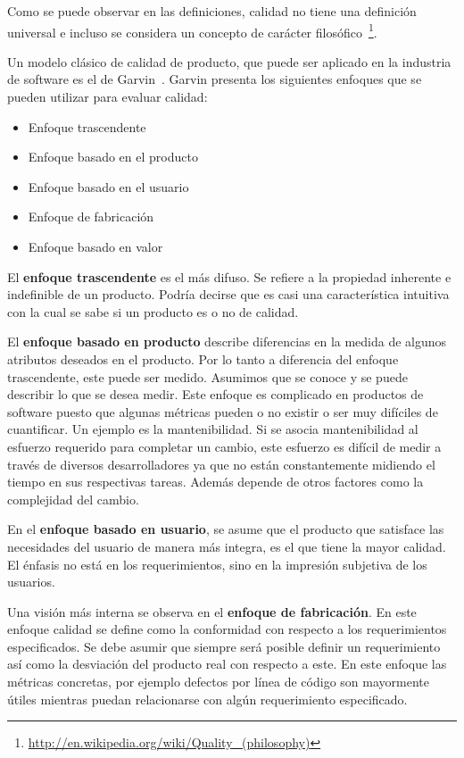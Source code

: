 Como se puede observar en las definiciones, calidad no tiene una definición universal e incluso se considera
un concepto de carácter filosófico~\footnote{\url{http://en.wikipedia.org/wiki/Quality_(philosophy)}}.

Un modelo clásico de calidad de producto, que puede ser aplicado en la industria
de software es el de Garvin~\cite{Garvin:1984}. Garvin presenta los siguientes
enfoques que se pueden utilizar para evaluar calidad:
\begin{itemize}
    \item Enfoque trascendente
    \item Enfoque basado en el producto
    \item Enfoque basado en el usuario
    \item Enfoque de fabricación
    \item Enfoque basado en valor
\end{itemize}

El \textbf{enfoque trascendente} es el más difuso. Se refiere a la propiedad inherente
e indefinible de un producto. Podría decirse que es casi una característica 
intuitiva con la cual se sabe si un producto es o no de calidad.

El \textbf{enfoque basado en producto} describe diferencias en la medida de algunos
atributos deseados en el producto. Por lo tanto a diferencia del enfoque
trascendente, este puede ser medido. Asumimos que se conoce y se puede 
describir lo que se desea medir.
Este enfoque es complicado en productos de software puesto que algunas métricas
pueden o no existir o ser muy difíciles de cuantificar. Un ejemplo es la mantenibilidad.
Si se asocia mantenibilidad al esfuerzo requerido para completar un cambio, este
esfuerzo es difícil de medir a través de diversos desarrolladores ya que no están
constantemente midiendo el tiempo en sus respectivas tareas. Además depende de 
otros factores como la complejidad del cambio.

En el \textbf{enfoque basado en usuario}, se asume que el producto que satisface
las necesidades del usuario de manera más integra, es el que tiene la mayor calidad. El énfasis
no está en los requerimientos, sino en la impresión subjetiva de los usuarios.

Una visión más interna se observa en el \textbf{enfoque de fabricación}. En este enfoque
calidad se define como la conformidad con respecto a los requerimientos especificados.
Se debe asumir que siempre será posible definir un requerimiento así como la desviación
del producto real con respecto a este. En este enfoque las métricas
concretas, por ejemplo defectos por línea de código son mayormente útiles mientras puedan
relacionarse con algún requerimiento especificado.

